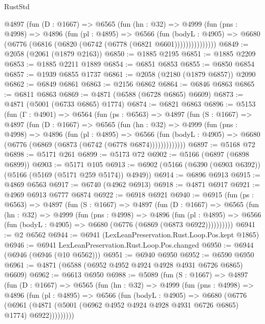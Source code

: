 \begin{lexlean}{RustStd}
\begin{coremodule}
{\begin{coremodule}
{{{{{{{{{{{{{{{{{{{{{{{{{{{{{          @4897
            (fun (D : @1667) =>
            @6565
              (fun (hn : @32) =>
              @4999
                (fun (pns : @4998) =>
                @4896
                  (fun (pl : @4895) =>
                  @6566
                    (fun (bodyL : @4905) =>
                    @6680 (@6776 (@6816 (@6820 (@6742 (@6778 (@6821 @6601)))))))))))))))
@6849 := @2058 (@2061 (@1879 @2163))
@6850 := @1885 @2195
@6851 := @1885 @2209
@6853 := @1885 @2211 @1889
@6854 := @6851 @6853
@6855 := @6850 @6854
@6857 := @1939 @6855 @1737
@6861 := @2058 (@2180 (@1879 @6857)) @2090
@6862 := @6849 @6861
@6863 := @2156 @6862
@6864 := @6846 @6863
@6865 := @6811 @6863
@6869 := @4871 (@6588 (@6728 @6865) @6609)
@6873 := @4871 (@5001 (@6733 @6865) @1774)
@6874 := @6821 @6863
@6896 := @5153
    (fun (Γ : @4901) =>
    @6564
      (fun (ps : @6563) =>
      @4897
        (fun (S : @1667) =>
        @4897
          (fun (D : @1667) =>
          @6565
            (fun (hn : @32) =>
            @4999
              (fun (pns : @4998) =>
              @4896
                (fun (pl : @4895) =>
                @6566
                  (fun (bodyL : @4905) =>
                  @6680 (@6776 (@6869 (@6873 (@6742 (@6778 @6874)))))))))))))
@6897 := @5168 @72
@6898 := @5171 @261
@6899 := @5173 @72
@6902 := @5166 (@6897 (@6898 @6899))
@6903 := @5171 @105
@6913 := @6902 (@5166 (@6390 (@6903 @6392)) (@5166 (@5169 (@5171 @259 @5174)) @4949))
@6914 := @6896 @6913
@6915 := @4869 @6563
@6917 := @6740 (@4962 @6913)
@6918 := @4871 @6917
@6921 := @4969 @6913 @6777 @6874
@6922 := @6918 @6921
@6940 := @6915
    (fun (ps : @6563) =>
    @4897
      (fun (S : @1667) =>
      @4897
        (fun (D : @1667) =>
        @6565
          (fun (hn : @32) =>
          @4999
            (fun (pns : @4998) =>
            @4896
              (fun (pl : @4895) =>
              @6566 (fun (bodyL : @4905) => @6680 (@6776 (@6869 (@6873 @6922))))))))))
@6941 := @2 @6562
@6944 := @6941 (LexLeanPreservation.Rust.Loop.Pos.kept @1865)
@6946 := @6941 LexLeanPreservation.Rust.Loop.Pos.changed
@6950 := @6944 (@6946 (@6946 (@10 @6562)))
@6951 := @6940 @6950
@6952 := @6590 @6950
@6961 := @4871 (@6588 (@6952 @4952 @4924 @4928 @4931 @6726 @6865) @6609)
@6962 := @6613 @6950
@6988 := @5089
    (fun (S : @1667) =>
    @4897
      (fun (D : @1667) =>
      @6565
        (fun (hn : @32) =>
        @4999
          (fun (pns : @4998) =>
          @4896
            (fun (pl : @4895) =>
            @6566
              (fun (bodyL : @4905) =>
              @6680
                (@6776
                  (@6961
                    (@4871 (@5001 (@6962 @4952 @4924 @4928 @4931 @6726 @6865) @1774) @6922)))))))))
}}}}}}}}}}}}}}}}}}}}}}}}}}}}}
\end{coremodule}}
\end{coremodule}
\end{lexlean}

